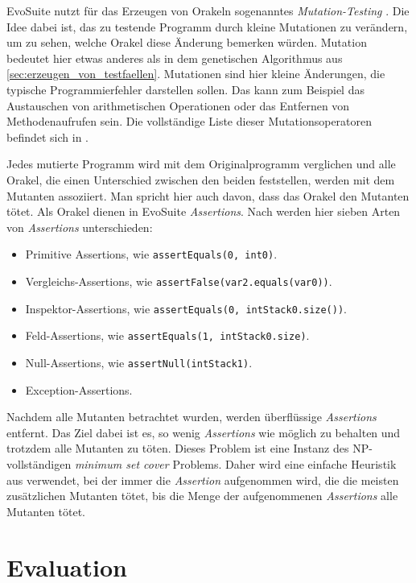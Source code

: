 \documentclass[a4paper,11pt]{article}
\begin{document}
EvoSuite nutzt für das Erzeugen von Orakeln sogenanntes \textit{Mutation-Testing} \cite{TSE12_Mutation, emse14_mutation}.
Die Idee dabei ist, das zu testende Programm durch kleine Mutationen zu verändern, um zu sehen, welche Orakel diese Änderung bemerken würden.
Mutation bedeutet hier etwas anderes als in dem genetischen Algorithmus aus \cref{sec:erzeugen_von_testfaellen}.
Mutationen sind hier kleine Änderungen, die typische Programmierfehler darstellen sollen.
Das kann zum Beispiel das Austauschen von arithmetischen Operationen oder das Entfernen von Methodenaufrufen sein.
Die vollständige Liste dieser Mutationsoperatoren befindet sich in \cite{emse14_mutation}.

Jedes mutierte Programm wird mit dem Originalprogramm verglichen und alle Orakel, die einen Unterschied zwischen den beiden feststellen, werden mit dem Mutanten assoziiert.
Man spricht hier auch davon, dass das Orakel den Mutanten tötet.
Als Orakel dienen in EvoSuite \textit{Assertions}.
Nach \citep{TSE12_Mutation} werden hier sieben Arten von \textit{Assertions} unterschieden:
\begin{itemize}
	\item Primitive Assertions, wie \lstinline{assertEquals(0, int0)}.
	\item Vergleichs-Assertions, wie \lstinline{assertFalse(var2.equals(var0))}.
	\item Inspektor-Assertions, wie \lstinline{assertEquals(0, intStack0.size())}.
	\item Feld-Assertions, wie \lstinline{assertEquals(1, intStack0.size)}.
	\item Null-Assertions, wie \lstinline{assertNull(intStack1)}.
	\item Exception-Assertions.
\end{itemize}
Nachdem alle Mutanten betrachtet wurden, werden überflüssige \textit{Assertions} entfernt.
Das Ziel dabei ist es, so wenig \textit{Assertions} wie möglich zu behalten und trotzdem alle Mutanten zu töten.
Dieses Problem ist eine Instanz des NP-vollständigen \textit{minimum set cover} Problems.
Daher wird eine einfache Heuristik aus \cite{chvatal1979greedy} verwendet, bei der immer die \textit{Assertion} aufgenommen wird, die die meisten zusätzlichen Mutanten tötet, bis die Menge der aufgenommenen \textit{Assertions} alle Mutanten tötet.

\section{Evaluation}
\end{document}
